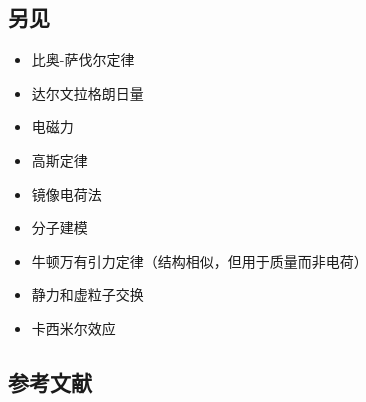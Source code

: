 \subsection{另见}
\begin{itemize}
\item 比奥-萨伐尔定律
\item 达尔文拉格朗日量
\item 电磁力
\item 高斯定律
\item 镜像电荷法
\item 分子建模
\item 牛顿万有引力定律（结构相似，但用于质量而非电荷）
\item 静力和虚粒子交换
\item 卡西米尔效应
\end{itemize}
\subsection{参考文献}
